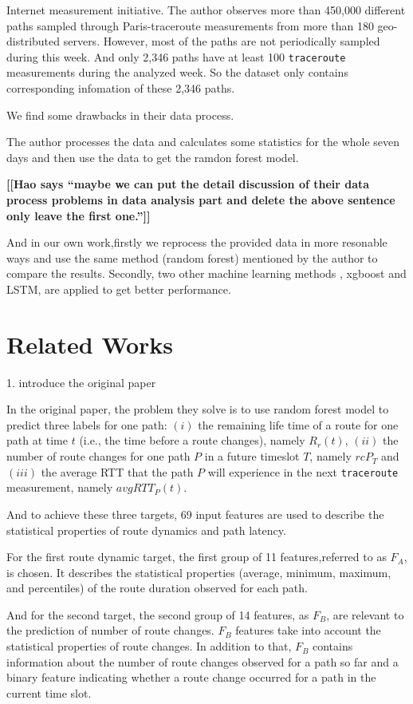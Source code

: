 \documentclass[sigconf]{acmart}
\newcommand{\hao}[1]{{\bf \color{red} [[Hao says ``#1'']]}}
\begin{document}
Internet measurement initiative. The author observes more than 450,000 different paths sampled through Paris-traceroute measurements from more than 180 geo-distributed servers. However, most of the paths are not periodically sampled during this week. And only 2,346 paths have at least 100 \texttt{traceroute} measurements during the analyzed week. So the dataset only contains corresponding infomation of these 2,346 paths.
 

We find some drawbacks in their data process.
 
The author processes the data and calculates some statistics for the whole seven days and then use the data to get the ramdon forest model.
 

\hao{maybe we can put the detail discussion of their data process problems in data analysis part and delete the above sentence only leave the first one.}
 

And in our own work,firstly we reprocess the provided data in more resonable ways and use the same method (random forest) mentioned by the author to compare the results. Secondly, two other machine learning methods , xgboost and LSTM, are applied to get better performance.
 

\section{Related Works}
 
1. introduce the original paper
 
In the original paper, the problem they solve is to use random forest model to predict three labels for one path: $(i)$ the remaining life time of a route for one path at time $t$ (i.e., the time before a route changes), namely $R_r(t)$, $(ii)$ the number of route changes for one path $P$ in a future timeslot $T$, namely $rcP_T$  and $(iii)$ the average RTT that the path $P$ will experience in the next \texttt{traceroute} measurement, namely $avgRTT_P(t)$.

And to achieve these three targets, 69 input features are used to describe the  statistical properties of route dynamics and path latency.
 
For the first route dynamic target, the first group of 11 features,referred to as $F_A$, is chosen. It describes the statistical properties (average, minimum, maximum, and percentiles) of the route duration observed for each path.
 
And for the second target, the second group of 14 features, as $F_B$, are relevant to the prediction of number of route changes. $F_B$ features take into account the statistical properties of route changes. In addition to that, $F_B$ contains information about the number of route changes observed for a path so far and a binary feature indicating whether a route change occurred for a path in the current time slot. 
 
\end{document}
